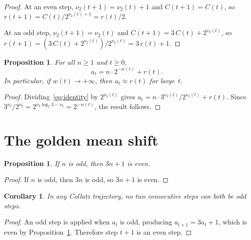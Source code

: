 \documentclass[manuscript]{aomart}
\theoremstyle{plain}
\newtheorem{proposition}[theorem]{Proposition}
\newtheorem{corollary}[theorem]{Corollary}
\theoremstyle{definition}
\theoremstyle{remark}
\numberwithin{equation}{section}
\begin{document}
\begin{proof}
At an even step, $\nu_2(t{+}1) = \nu_2(t) + 1$ and
$C(t{+}1) = C(t)$, so
$r(t{+}1) = C(t)/2^{\nu_2(t)+1} = r(t)/2$.

At an odd step, $\nu_2(t{+}1) = \nu_2(t)$ and
$C(t{+}1) = 3\,C(t) + 2^{\nu_2(t)}$, so
$r(t{+}1) = (3\,C(t) + 2^{\nu_2(t)})/2^{\nu_2(t)} = 3\,r(t) + 1$.
\end{proof}

\begin{proposition}\label{prop:a-decomposition}
For all $n \ge 1$ and $t \ge 0$,
\begin{equation}\label{eq:a-decomposition}
  a_t = n \cdot 2^{-w(t)} + r(t).
\end{equation}
In particular, if $w(t) \to +\infty$, then $a_t \approx r(t)$ for
large~$t$.
\end{proposition}

\begin{proof}
Dividing~\eqref{eq:identity} by $2^{\nu_2(t)}$ gives
$a_t = n \cdot 3^{\nu_3(t)} / 2^{\nu_2(t)} + r(t)$.  Since
$3^{\nu_3} / 2^{\nu_2} = 2^{\nu_3 \log_2 3 - \nu_2} = 2^{-w(t)}$,
the result follows.
\end{proof}

\section{The golden mean shift}\label{sec:golden}

\begin{proposition}\label{prop:odd-gives-even}
If $n$ is odd, then $3n + 1$ is even.
\end{proposition}

\begin{proof}
If $n$ is odd, then $3n$ is odd, so $3n + 1$ is even.
\end{proof}

\begin{corollary}\label{cor:no-11}
In any Collatz trajectory, no two consecutive steps can both be odd
steps.
\end{corollary}

\begin{proof}
An odd step is applied when $a_t$ is odd, producing
$a_{t+1} = 3a_t + 1$, which is even by
Proposition~\ref{prop:odd-gives-even}.  Therefore step $t{+}1$ is an
even step.
\end{proof}
\end{document}

